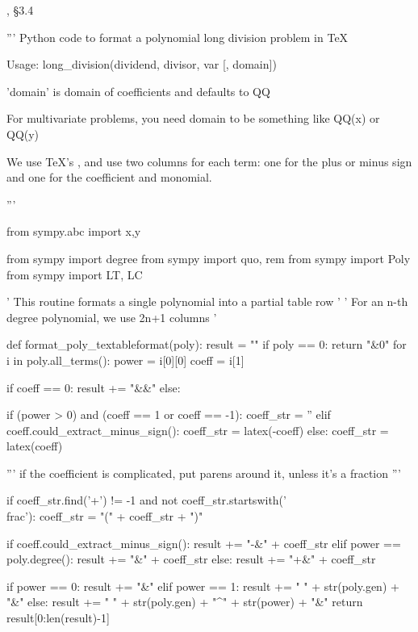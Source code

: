 , \S3.4

\begin{sympycode}
'''
Python code to format a polynomial long division problem in TeX

Usage: long_division(dividend, divisor, var [, domain])

'domain' is domain of coefficients and defaults to QQ

For multivariate problems, you need domain to be something
like QQ(x) or QQ(y)

We use TeX's \halign, and use two columns for each term: one for the
plus or minus sign and one for the coefficient and monomial.

'''

from sympy.abc import x,y

from sympy import degree
from sympy import quo, rem
from sympy import Poly
from sympy import LT, LC

' This routine formats a single polynomial into a partial table row '
' For an n-th degree polynomial, we use 2n+1 columns                '

def format_poly_textableformat(poly):
   result = ""
   if poly == 0:
      return "&0"
   for i in poly.all_terms():
      power = i[0][0]
      coeff = i[1]

      if coeff == 0:
         result += "&&"
      else:

         if (power > 0) and (coeff == 1 or coeff == -1):
            coeff_str = ''
         elif coeff.could_extract_minus_sign():
            coeff_str = latex(-coeff)
         else:
            coeff_str = latex(coeff)

         ''' if the coefficient is complicated, put parens around it, unless it's a fraction '''

         if coeff_str.find('+') != -1 and not coeff_str.startswith('\\frac'):
            coeff_str = "(" + coeff_str + ")"

         if coeff.could_extract_minus_sign():
            result += "-&" + coeff_str
         elif power == poly.degree():
            result += "&" + coeff_str
         else:
            result += "+&" + coeff_str

         if power == 0:
            result += "&"
         elif power == 1:
            result += " " + str(poly.gen) + "&"
         else:
            result += " " + str(poly.gen) + "^{" + str(power) + "}&"
   return result[0:len(result)-1]


\end{sympycode}
